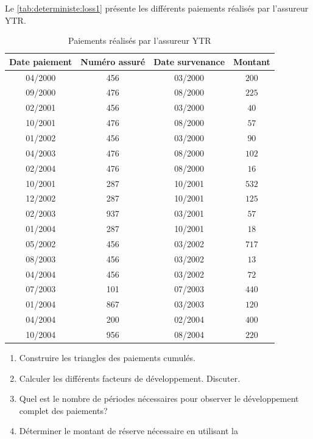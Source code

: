 \begin{exercice}
  Le \autoref{tab:deterministe:loss1} présente les différents
  paiements réalisés par l'assureur YTR.
  \begin{table}[!h]
    \centering
    \caption{Paiements réalisés par l'assureur YTR}
    \label{tab:deterministe:loss1}
    \begin{tabular}{cccc}
      \toprule
      Date paiement & Numéro assuré & Date survenance & Montant\\
      \midrule
      04/2000 & 456 & 03/2000 & $200$\\
      09/2000 & 476 & 08/2000 & $225$\\
      02/2001 & 456 & 03/2000 & $40$\\
      10/2001 & 476 & 08/2000 & $57$\\
      01/2002 & 456 & 03/2000 & $90$\\
      04/2003 & 476 & 08/2000 & $102$\\
      02/2004 & 476 & 08/2000 & $16$\\
      10/2001 & 287 & 10/2001 & $532$\\
      12/2002 & 287 & 10/2001 & $125$\\
      02/2003 & 937 & 03/2001 & $57$\\
      01/2004 & 287 & 10/2001 & $18$\\
      05/2002 & 456 & 03/2002 & $717$\\
      08/2003 & 456 & 03/2002 & $13$\\
      04/2004 & 456 & 03/2002 & $72$\\
      07/2003 & 101 & 07/2003 & $440$\\
      01/2004 & 867 & 03/2003 & $120$\\
      04/2004 & 200 & 02/2004 & $400$\\
      10/2004 & 956 & 08/2004 & $220$\\
      \bottomrule
    \end{tabular}
  \end{table}
  \begin{enumerate}
  \item Construire les triangles des paiements cumulés.
  \item Calculer les différents facteurs de développement. Discuter.
  \item Quel est le nombre de périodes nécessaires pour observer le
    développement complet des paiements?
  \item Déterminer le montant de réserve nécessaire en utilisant la

\end{enumerate}
\end{exercice}
